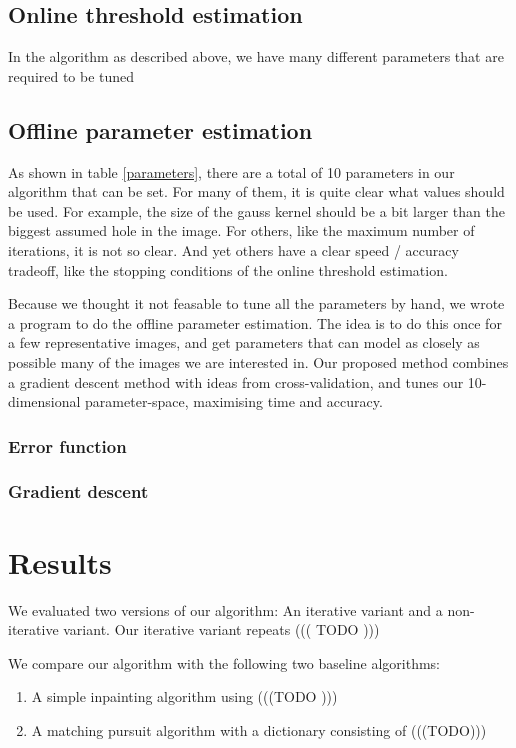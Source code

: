 \documentclass[10pt,conference,compsocconf]{IEEEtran}
\begin{document}
\subsection{Online threshold estimation}
In the algorithm as described above, we have many different parameters that are required to be tuned

\subsection{Offline parameter estimation}
As shown in table \ref{parameters}, there are a total of 10 parameters in our algorithm that can be set.
For many of them, it is quite clear what values should be used. For example, the size of the gauss kernel
should be a bit larger than the biggest assumed hole in the image. For others, like the maximum number of
iterations, it is not so clear. And yet others have a clear speed / accuracy tradeoff, like the stopping
conditions of the online threshold estimation.

Because we thought it not feasable to tune all the parameters by hand, we wrote a program to
do the offline parameter estimation. The idea is to do this once for a few representative images, and get
parameters that can model as closely as possible many of the images we are interested in.
Our proposed method combines a gradient descent method with ideas from cross-validation, and tunes our
10-dimensional parameter-space, maximising time and accuracy.

\subsubsection{Error function}

\subsubsection{Gradient descent}


\section{Results}
We evaluated two versions of our algorithm: An iterative variant and a non-iterative variant.
Our iterative variant repeats 
 ((( TODO )))
 
 We compare our algorithm with the following two baseline algorithms:
 \begin{enumerate}
 \item A simple inpainting algorithm using (((TODO )))
 \item A matching pursuit algorithm with a dictionary consisting of (((TODO)))
 \end{enumerate}
 
\end{document}
